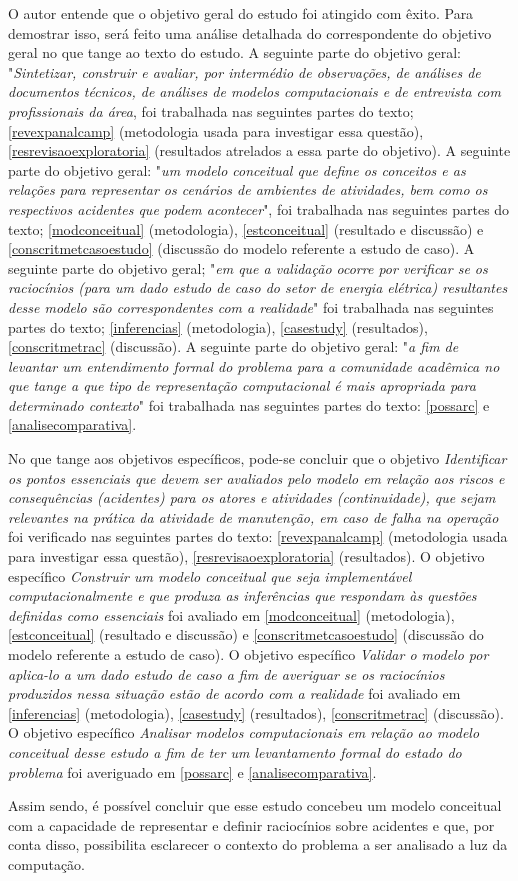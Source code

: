O autor entende que o objetivo geral do estudo foi atingido com êxito. Para demostrar isso, será feito uma análise detalhada do correspondente do objetivo geral no que tange ao texto do estudo. A seguinte parte do objetivo geral: "\textit{Sintetizar, construir e avaliar, por intermédio de observações, de análises de documentos técnicos, de análises de modelos computacionais e de entrevista com profissionais da área}, foi trabalhada nas seguintes partes do texto; \ref{revexpanalcamp} (metodologia usada para investigar essa questão), \ref{resrevisaoexploratoria} (resultados atrelados a essa parte do objetivo).  A seguinte parte do objetivo geral: "\textit{um modelo conceitual que define os conceitos e as relações para representar os cenários de ambientes de atividades, bem como os respectivos acidentes que podem acontecer}", foi trabalhada nas seguintes partes do texto; \ref{modconceitual} (metodologia), \ref{estconceitual} (resultado e discussão) e \ref{conscritmetcasoestudo} (discussão do modelo referente a estudo de caso). A seguinte parte do objetivo geral; "\textit{em que a validação ocorre por verificar se os raciocínios (para um dado estudo de caso do setor de energia elétrica) resultantes desse modelo são correspondentes com a realidade}" foi trabalhada nas seguintes partes do texto; \ref{inferencias} (metodologia), \ref{casestudy} (resultados), \ref{conscritmetrac} (discussão). A seguinte parte do objetivo geral: "\textit{a fim de levantar um entendimento formal do problema para a comunidade acadêmica no que tange a que tipo de representação computacional é mais apropriada para determinado contexto}" foi trabalhada nas seguintes partes do texto: \ref{possarc} e \ref{analisecomparativa}.

No que tange aos objetivos específicos, pode-se concluir que o objetivo \textit{Identificar os pontos essenciais que devem ser avaliados pelo modelo em relação aos riscos e consequências (acidentes) para os atores e atividades (continuidade), que sejam relevantes na prática da atividade de manutenção, em caso de falha na operação} foi verificado nas seguintes partes do texto: \ref{revexpanalcamp} (metodologia usada para investigar essa questão), \ref{resrevisaoexploratoria} (resultados). O objetivo específico \textit{Construir um modelo conceitual que seja implementável computacionalmente e que produza as inferências que respondam às questões definidas como essenciais} foi avaliado em \ref{modconceitual} (metodologia), \ref{estconceitual} (resultado e discussão) e \ref{conscritmetcasoestudo} (discussão do modelo referente a estudo de caso). O objetivo específico \textit{Validar o modelo por aplica-lo a um dado estudo de caso a fim de averiguar se os raciocínios produzidos nessa situação estão de acordo com a realidade} foi avaliado em \ref{inferencias} (metodologia), \ref{casestudy} (resultados), \ref{conscritmetrac} (discussão). O objetivo específico \textit{Analisar modelos computacionais em relação ao modelo conceitual desse estudo a fim de ter um levantamento formal do estado do problema} foi averiguado em \ref{possarc} e \ref{analisecomparativa}.

Assim sendo, é possível concluir que esse estudo concebeu um modelo conceitual com a capacidade de representar e definir raciocínios sobre acidentes e que, por conta disso, possibilita esclarecer o contexto do problema a ser analisado a luz da computação. 